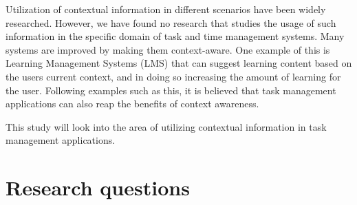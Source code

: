 Utilization of contextual information in different scenarios have been widely researched. However, we have found no research that studies the usage of such information in the specific domain of task and time management systems. Many systems are improved by making them context-aware. One example of this is Learning Management Systems (LMS) that can suggest learning content based on the users current context, and in doing so increasing the amount of learning for the user. Following examples such as this, it is believed that task management applications can also reap the benefits of context awareness.

This study will look into the area of utilizing contextual information in task management applications.

\section{Research questions}